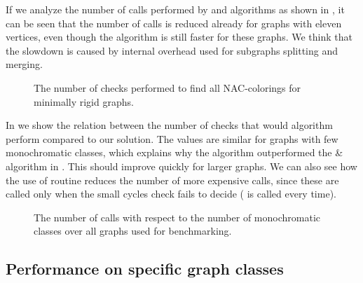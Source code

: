 If we analyze the number of \IsNACColoring{} calls performed by \NaiveCycles{} and \Subgraphs{} algorithms
as shown in ,
it can be seen that the number of \IsNACColoring{} calls is reduced already for graphs
with eleven vertices,
even though the \NaiveCycles{} algorithm is still faster for these graphs.
%
We think that the slowdown is caused by internal overhead
used for subgraphs splitting and merging.

\begin{figure}[ht]
	\centering
	\scalebox{0.5}{}
	\caption[Checks performed for minimally rigid graphs.]{
		The number of checks performed to find all NAC-colorings for minimally rigid graphs.}%
	\label{fig:graph_count_minimally_rigid}
\end{figure}%

In 
we show the relation between the number of \IsNACColoring{} checks that
would \Naive{} algorithm perform compared to our solution.
%
The values are similar for graphs with few monochromatic classes,
which explains why the \NaiveCycles{} algorithm outperformed
the \NeighborsDegree{}\&\MergeLinear{} algorithm in . This should improve quickly for larger graphs.
We can also see how the use of \CycleMask{} routine
reduces the number of more expensive \IsNACColoring{} calls,
since these are called only when the small cycles check \CycleMask{} fails to decide
(\CycleMask{} is called every time).

\begin{figure}[ht]
	\centering
	\scalebox{0.5}{}
	\caption[The number of \IsNACColoring{} calls.]{
		The number of \IsNACColoring{} calls with respect to the number of monochromatic classes
		over all graphs used for benchmarking.}%
	\label{fig:graph_summary}
\end{figure}%






\subsection{Performance on specific graph classes}%
\label{sec:bench_graph_classes}


